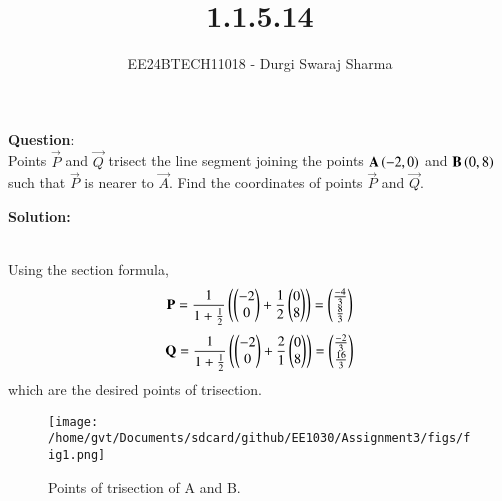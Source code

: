 \documentclass[journal]{IEEEtran}
\begin{document}

\vspace{3cm}

\title{1.1.5.14}
\author{EE24BTECH11018 - Durgi Swaraj Sharma
}
{\let\newpage\relax\maketitle}

\renewcommand{\thefigure}{\theenumi}
\renewcommand{\thetable}{\theenumi}
\setlength{\intextsep}{10pt} %


\renewcommand{\thetable}{\theenumi}


 \textbf{Question}:\\
Points $\vec{P}$ and $\vec{Q}$ trisect the line segment joining the points $\mathbf{A}\left(-2, 0\right)$ and $\mathbf{B}\left(0, 8\right)$ such that $\vec{P}$ is nearer to $\vec{A}$. Find the coordinates of points $\vec{P}$ and $\vec{Q}$. \hfill {}

\textbf{Solution: }\\
    \begin{table}[h!]    
      \centering
      
      \caption{}
    \end{table}\\
 Using the section formula,
\begin{align}
	\mathbf{P} = \frac{1}{1+{\frac{1}{2}}}\left(\begin{pmatrix}-2 \\ 0\end{pmatrix}+\frac{1}{2}\begin{pmatrix}0 \\ 8\end{pmatrix}\right)=\begin{pmatrix}\frac{-4}{3} \\ \frac{8}{3}\end{pmatrix} \label{eq1.1.5.14.1}
\end{align}
\begin{align}
	\mathbf{Q} = \frac{1}{1+{\frac{1}{2}}}\left(\begin{pmatrix}-2 \\ 0\end{pmatrix}+\frac{2}{1}\begin{pmatrix}0 \\ 8\end{pmatrix}\right)=\begin{pmatrix}\frac{-2}{3} \\ \frac{16}{3}\end{pmatrix} \label{eq1.1.5.14.2}
\end{align}
which are the desired points of trisection.
    \begin{figure}[h]
        \centering
       \texttt{[image: /home/gvt/Documents/sdcard/github/EE1030/Assignment3/figs/fig1.png]}
       \caption{Points of trisection of A and B.}
       \label{graph}
    \end{figure}
\end{document}
